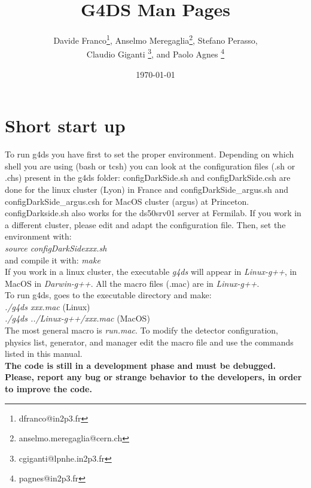 \documentclass[twocolumn, 10pt]{article}
\begin{document}


\title{G4DS Man Pages}
\author{Davide Franco\thanks{dfranco@in2p3.fr}, Anselmo Meregaglia\thanks{anselmo.meregaglia@cern.ch},  Stefano Perasso, \\ Claudio Giganti \thanks{cgiganti@lpnhe.in2p3.fr}, and Paolo Agnes \thanks{pagnes@in2p3.fr}}

\date{\today}
\maketitle

\tableofcontents

\section{Short start up}
To run g4ds you have first to set the proper environment. Depending on which shell you are using (bash or tcsh) you can
look at the configuration files (.sh or .chs) present in the g4ds folder: configDarkSide.sh and configDarkSide.csh are
done for the linux  cluster (Lyon) in France and configDarkSide\_argus.sh and configDarkSide\_argus.csh for MacOS
cluster (argus) at Princeton. configDarkside.sh also works for the ds50srv01 server at Fermilab. If you work in a different cluster, please edit and adapt the configuration file. Then, set the environment with:\\
 \textit{source configDarkSidexxx.sh} \\
and compile it with: \textit{make} \\
 If you work in a linux cluster, the executable \textit{g4ds} will appear in \textit{Linux-g++}, in MacOS in \textit{Darwin-g++}. All the macro files (.mac) are in \textit{Linux-g++}. \\
To run g4ds, goes to the executable directory and make:\\
\textit{./g4ds xxx.mac}  (Linux)\\
\textit{./g4ds ../Linux-g++/xxx.mac}  (MacOS)\\
The most general macro is \textit{run.mac}. To modify the detector configuration, physics list, generator, and manager edit the macro file and use the commands listed in this manual.\\
{\bf{The code is still in a development phase and must be debugged. Please, report any bug or strange behavior to the developers, in order to improve the code.}}

 
\end{document}
